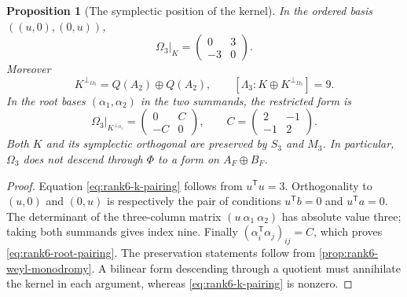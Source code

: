 \documentclass[11pt]{article}
\newtheorem{proposition}[theorem]{Proposition}
\theoremstyle{definition}
\theoremstyle{remark}
\numberwithin{equation}{section}
\begin{document}
\begin{proposition}[The symplectic position of the kernel]
\label{prop:rank6-kernel-pairing}
In the ordered basis \(((u,0),(0,u))\),
\begin{equation}
 \Omega_3|_K=\begin{pmatrix}0&3\\-3&0\end{pmatrix}.     \label{eq:rank6-k-pairing}
\end{equation}
Moreover
\[
 K^{\perp_{\Omega_3}}=Q(A_2)\oplus Q(A_2),\qquad
 [\Lambda_3:K\oplus K^{\perp_{\Omega_3}}]=9.
\]
In the root bases \((\alpha_1,\alpha_2)\) in the two summands, the restricted
form is
\begin{equation}
 \Omega_3|_{K^{\perp_{\Omega_3}}}
 =\begin{pmatrix}0&C\\-C&0\end{pmatrix},
 \qquad C=\begin{pmatrix}2&-1\\-1&2\end{pmatrix}.       \label{eq:rank6-root-pairing}
\end{equation}
Both \(K\) and its symplectic orthogonal are preserved by \(S_3\) and
\(M_3\).  In particular, \(\Omega_3\) does not descend through \(\Phi\) to
a form on \(A_F\oplus B_F\).
\end{proposition}

\begin{proof}
Equation \eqref{eq:rank6-k-pairing} follows from \(u^{\mathsf T}u=3\).
Orthogonality to \((u,0)\) and \((0,u)\) is respectively the pair of
conditions \(u^{\mathsf T}b=0\) and \(u^{\mathsf T}a=0\).  The determinant
of the three-column matrix \((u\ \alpha_1\ \alpha_2)\) has absolute value
three; taking both summands gives index nine.  Finally
\((\alpha_i^{\mathsf T}\alpha_j)_{ij}=C\), which proves
\eqref{eq:rank6-root-pairing}.  The preservation statements follow from
\cref{prop:rank6-weyl-monodromy}.  A bilinear form descending through a
quotient must annihilate the kernel in each argument, whereas
\eqref{eq:rank6-k-pairing} is nonzero.
\end{proof}
\end{document}
